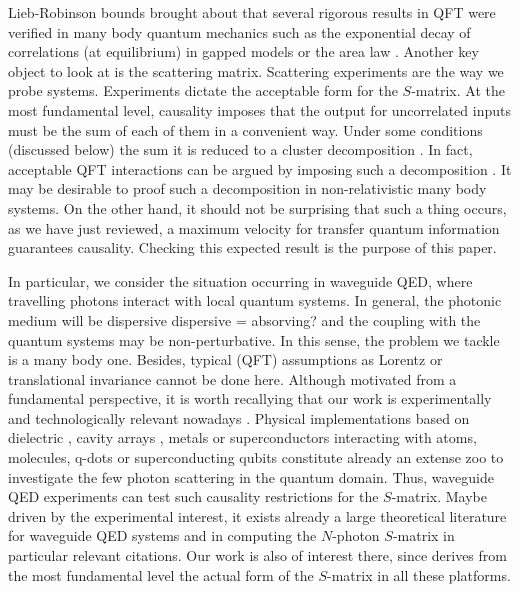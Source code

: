 \documentclass[notitlepage, prx, preprint, amsmath,superscriptaddress,amssymb]{revtex4-1}
\begin{document}
Lieb-Robinson bounds  brought about that several rigorous results in QFT  were verified in many body quantum mechanics such as the exponential decay of correlations (at equilibrium)  in gapped models or  the area law \cite{Nachtergaele2006, Hastings2007}.   Another key object  to look at is the scattering matrix.  Scattering experiments  are the way we probe systems.  Experiments dictate the acceptable form for the $S$-matrix.  At the most fundamental level, causality imposes that the output for  uncorrelated inputs must be the sum of each of them in a convenient way.   Under some conditions (discussed below) the sum it is reduced to a  cluster decomposition \cite{Wichmann1963}.   
In fact,  acceptable QFT interactions  can be argued by imposing such a decomposition   \cite[Chap. 4]{weinberg1995}.   
It may be desirable to proof such a decomposition in non-relativistic many body systems.  On the other hand, it should not be  surprising that such a thing occurs, as we have just reviewed, a maximum velocity for transfer quantum information guarantees causality.  Checking this expected result is the purpose of this paper.

In particular, we consider the situation  occurring in  waveguide QED,  where travelling photons interact with local quantum systems.   In general, the photonic medium will be dispersive
{\color{red} dispersive = absorving?} and the coupling with the quantum systems may be non-perturbative.  In this sense, the problem we tackle is a many body one.  Besides,  typical (QFT) assumptions as Lorentz or translational invariance cannot be done here.  Although  motivated from a fundamental perspective, it is worth recallying that our work is experimentally  and technologically relevant nowadays \cite{lodahl15review}.
Physical implementations based on dielectric \cite{Mitsch2014, Yu2014}, cavity arrays \cite{Vuckovic2003}, metals  \cite{Lukin2007} or superconductors \cite{astafiev10, hoi11, Liu2016, Forn-Diaz2016} interacting with atoms, molecules,  q-dots or superconducting qubits constitute already an extense zoo to investigate the few photon scattering in the quantum domain. 
Thus,  waveguide QED experiments can test such causality restrictions for the $S$-matrix. 
Maybe driven by  the experimental interest, it exists already a large  theoretical literature for  waveguide QED systems \cite{Roy2016}  and in  computing the $N$-photon $S$-matrix in particular {\color{red} relevant citations}.  Our work is also of interest there, since derives from the most fundamental level the actual form of the $S$-matrix in all these platforms.
\end{document}
